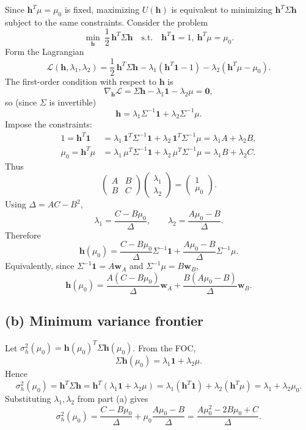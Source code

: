 \documentclass{article}
\begin{document}
Since $\mathbf h^{T}\mu=\mu_0$ is fixed, maximizing $U(\mathbf h)$ is equivalent to minimizing
$\mathbf h^{T}\Sigma \mathbf h$ subject to the same constraints. Consider the problem
\[
\min_{\mathbf h}\ \frac12\,\mathbf h^{T}\Sigma \mathbf h
\quad\text{s.t.}\quad
\mathbf h^{T}\mathbf 1=1,\ \mathbf h^{T}\mu=\mu_0.
\]
Form the Lagrangian
\[
\mathcal L(\mathbf h,\lambda_1,\lambda_2)
=\frac12\,\mathbf h^{T}\Sigma \mathbf h
-\lambda_1(\mathbf h^{T}\mathbf 1-1)
-\lambda_2(\mathbf h^{T}\mu-\mu_0).
\]
The first-order condition with respect to $\mathbf h$ is
\[
\nabla_{\mathbf h}\mathcal L
=\Sigma \mathbf h-\lambda_1\mathbf 1-\lambda_2\mu=\mathbf 0,
\]
so (since $\Sigma$ is invertible)
\[
\mathbf h=\lambda_1\Sigma^{-1}\mathbf 1+\lambda_2\Sigma^{-1}\mu.
\]
Impose the constraints:
\begin{align*}
1=\mathbf h^{T}\mathbf 1
&=\lambda_1\,\mathbf 1^{T}\Sigma^{-1}\mathbf 1+\lambda_2\,\mathbf 1^{T}\Sigma^{-1}\mu
=\lambda_1 A+\lambda_2 B,\\
\mu_0=\mathbf h^{T}\mu
&=\lambda_1\,\mu^{T}\Sigma^{-1}\mathbf 1+\lambda_2\,\mu^{T}\Sigma^{-1}\mu
=\lambda_1 B+\lambda_2 C.
\end{align*}
Thus
\[
\begin{pmatrix}
A & B\\
B & C
\end{pmatrix}
\begin{pmatrix}
\lambda_1\\
\lambda_2
\end{pmatrix}
=
\begin{pmatrix}
1\\
\mu_0
\end{pmatrix}.
\]
Using $\Delta=AC-B^2$,
\[
\lambda_1=\frac{C-B\mu_0}{\Delta},\qquad
\lambda_2=\frac{A\mu_0-B}{\Delta}.
\]
Therefore
\[
\boxed{
\mathbf h(\mu_0)=\frac{C-B\mu_0}{\Delta}\Sigma^{-1}\mathbf 1
+\frac{A\mu_0-B}{\Delta}\Sigma^{-1}\mu.
}
\]
Equivalently, since $\Sigma^{-1}\mathbf 1=A\mathbf w_A$ and $\Sigma^{-1}\mu=B\mathbf w_B$,
\[
\boxed{
\mathbf h(\mu_0)=\frac{A(C-B\mu_0)}{\Delta}\mathbf w_A
+\frac{B(A\mu_0-B)}{\Delta}\mathbf w_B.
}
\]

\subsection*{(b) Minimum variance frontier}

Let $\sigma_h^2(\mu_0)=\mathbf h(\mu_0)^{T}\Sigma \mathbf h(\mu_0)$. From the FOC,
\[
\Sigma \mathbf h(\mu_0)=\lambda_1\mathbf 1+\lambda_2\mu.
\]
Hence
\[
\sigma_h^2(\mu_0)
=\mathbf h^{T}\Sigma \mathbf h
=\mathbf h^{T}(\lambda_1\mathbf 1+\lambda_2\mu)
=\lambda_1(\mathbf h^{T}\mathbf 1)+\lambda_2(\mathbf h^{T}\mu)
=\lambda_1+\lambda_2\mu_0.
\]
Substituting $\lambda_1,\lambda_2$ from part (a) gives
\[
\sigma_h^2(\mu_0)
=\frac{C-B\mu_0}{\Delta}+\mu_0\frac{A\mu_0-B}{\Delta}
=\boxed{\frac{A\mu_0^2-2B\mu_0+C}{\Delta}}.
\]
\end{document}
